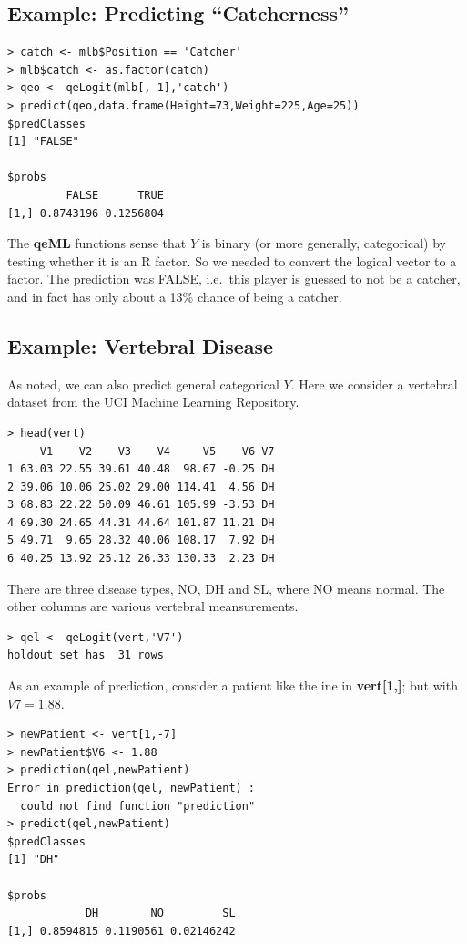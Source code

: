 \subsection{Example:  Predicting ``Catcherness''}

\begin{lstlisting}
> catch <- mlb$Position == 'Catcher'
> mlb$catch <- as.factor(catch)
> qeo <- qeLogit(mlb[,-1],'catch')
> predict(qeo,data.frame(Height=73,Weight=225,Age=25))
$predClasses
[1] "FALSE"

$probs
         FALSE      TRUE
[1,] 0.8743196 0.1256804
\end{lstlisting}

The \textbf{qeML} functions sense that $Y$ is binary (or more generally,
categorical) by testing whether it is an R factor.  So we needed to
convert the logical vector to a factor.  The prediction was FALSE, i.e.\
this player is guessed to not be a catcher, and in fact has only about a
13\% chance of being a catcher.

\subsection{Example:  Vertebral Disease}

As noted, we can also predict general categorical $Y$.  Here we
consider a vertebral dataset from the UCI Machine Learning Repository.

\begin{lstlisting}
> head(vert)
     V1    V2    V3    V4     V5    V6 V7
1 63.03 22.55 39.61 40.48  98.67 -0.25 DH
2 39.06 10.06 25.02 29.00 114.41  4.56 DH
3 68.83 22.22 50.09 46.61 105.99 -3.53 DH
4 69.30 24.65 44.31 44.64 101.87 11.21 DH
5 49.71  9.65 28.32 40.06 108.17  7.92 DH
6 40.25 13.92 25.12 26.33 130.33  2.23 DH
\end{lstlisting}

There are three disease types, NO, DH and SL, where NO means normal.
The other columns are various vertebral meansurements.

\begin{lstlisting}
> qel <- qeLogit(vert,'V7')
holdout set has  31 rows
\end{lstlisting}

As an example of prediction, consider a patient like the ine in
\textbf{vert[1,]}; but with $V7 = 1.88$.

\begin{lstlisting}
> newPatient <- vert[1,-7]
> newPatient$V6 <- 1.88
> prediction(qel,newPatient)
Error in prediction(qel, newPatient) : 
  could not find function "prediction"
> predict(qel,newPatient)
$predClasses
[1] "DH"

$probs
            DH        NO         SL
[1,] 0.8594815 0.1190561 0.02146242
\end{lstlisting}

